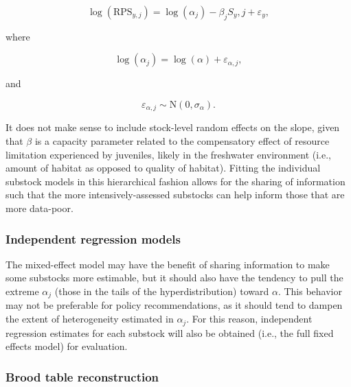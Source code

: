 \documentclass[12pt,]{book}
\theoremstyle{definition}
\theoremstyle{definition}
\theoremstyle{definition}
\theoremstyle{remark}
\begin{document}
\begin{equation}
  \log(\text{RPS}_{y,j})=\log(\alpha_j)-\beta_j S_y,j + \varepsilon_y,
  \label{eq:lin-ricker-mixed}
\end{equation}

\noindent
where

\begin{equation}
  \log(\alpha_j)=\log(\alpha) + \varepsilon_{\alpha,j},
  \label{eq:random-alpha}
\end{equation}

\noindent
and

\begin{equation}
  \varepsilon_{\alpha,j} \sim \text{N}(0,\sigma_{\alpha}).
  \label{eq:random-alpha-errors}
\end{equation}

It does not make sense to include stock-level random effects on the
slope, given that \(\beta\) is a capacity parameter related to the
compensatory effect of resource limitation experienced by juveniles,
likely in the freshwater environment (i.e., amount of habitat as opposed
to quality of habitat). Fitting the individual substock models in this
hierarchical fashion allows for the sharing of information such that the
more intensively-assessed substocks can help inform those that are more
data-poor.

\subsubsection{Independent regression
models}\label{independent-regression-models}

\noindent
The mixed-effect model may have the benefit of sharing information to
make some substocks more estimable, but it should also have the tendency
to pull the extreme \(\alpha_j\) (those in the tails of the
hyperdistribution) toward \(\alpha\). This behavior may not be
preferable for policy recommendations, as it should tend to dampen the
extent of heterogeneity estimated in \(\alpha_j\). For this reason,
independent regression estimates for each substock will also be obtained
(i.e., the full fixed effects model) for evaluation.

\subsubsection{Brood table
reconstruction}\label{brood-table-reconstruction}
\end{document}
